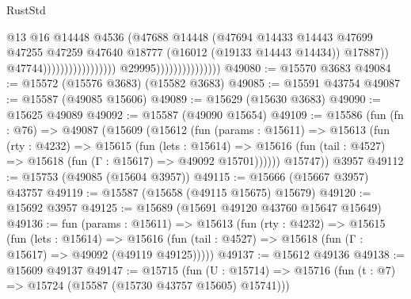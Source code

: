 \begin{lexlean}{RustStd}
\begin{coremodule}
                                                                    @13
                                                                    @16
                                                                    @14448
                                                                    @4536
                                                                    (@47688
                                                                      @14448
                                                                      (@47694
                                                                        @14433
                                                                        @14443
                                                                        @47699
                                                                        @47255
                                                                        @47259
                                                                        @47640
                                                                        @18777
                                                                        (@16012
                                                                          (@19133 @14443 @14434))
                                                                        @17887))
                                                                    @47744)))))))))))))))))
                                  @29995)))))))))))))))
@49080 := @15570 @3683
@49084 := @15572 (@15576 @3683) (@15582 @3683)
@49085 := @15591 @43754
@49087 := @15587 (@49085 @15606)
@49089 := @15629 (@15630 @3683)
@49090 := @15625 @49089
@49092 := @15587 (@49090 @15654)
@49109 := @15586
    (fun (fn : @76) =>
    @49087
      (@15609
        (@15612
          (fun (params : @15611) =>
          @15613
            (fun (rty : @4232) =>
            @15615
              (fun (lets : @15614) =>
              @15616 (fun (tail : @4527) => @15618 (fun (Γ : @15617) => @49092 @15701))))))
        @15747))
    @3957
@49112 := @15753 (@49085 (@15604 @3957))
@49115 := @15666 (@15667 @3957) @43757
@49119 := @15587 (@15658 (@49115 @15675) @15679)
@49120 := @15692 @3957
@49125 := @15689 (@15691 @49120 @43760 @15647 @15649)
@49136 := fun (params : @15611) =>
  @15613
    (fun (rty : @4232) =>
    @15615
      (fun (lets : @15614) =>
      @15616 (fun (tail : @4527) => @15618 (fun (Γ : @15617) => @49092 (@49119 @49125)))))
@49137 := @15612 @49136
@49138 := @15609 @49137
@49147 := @15715
    (fun (U : @15714) => @15716 (fun (t : @7) => @15724 (@15587 (@15730 @43757 @15605) @15741)))

\end{coremodule}
\end{lexlean}
